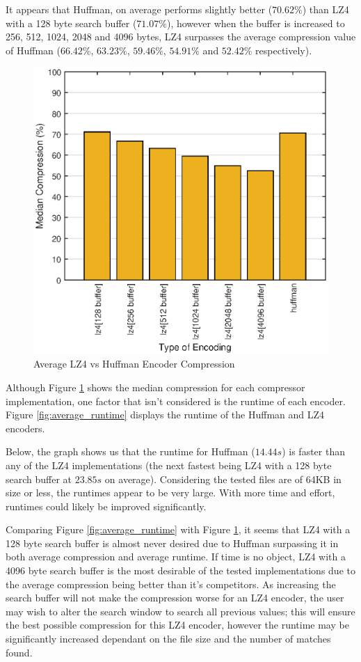 \documentclass[12pt]{article}
\begin{document}
It appears that Huffman, on average performs slightly better ($70.62\%$) than LZ4 with a 128 byte search buffer ($71.07\%$), however when the buffer is increased to 256, 512, 1024, 2048 and 4096 bytes, LZ4 surpasses the average compression value of Huffman ($66.42\%$, $63.23\%$, $59.46\%$, $54.91\%$ and $52.42\%$ respectively). 

\begin{figure}[H]
	\centering
	\includegraphics[width=6.0in]{average_compression}
	\caption{Average LZ4 vs Huffman Encoder Compression}
	\label{fig:average_compression}
\end{figure}

Although Figure \ref{fig:average_compression} shows the median compression for each compressor implementation, one factor that isn't considered is the runtime of each encoder. Figure \ref{fig:average_runtime} displays the runtime of the Huffman and LZ4 encoders.

Below, the graph shows us that the runtime for Huffman ($14.44s$) is faster than any of the LZ4 implementations (the next fastest being LZ4 with a 128 byte search buffer at $23.85s$ on average). Considering the tested files are of 64KB in size or less, the runtimes appear to be very large. With more time and effort, runtimes could likely be improved significantly.

Comparing Figure \ref{fig:average_runtime} with Figure \ref{fig:average_compression}, it seems that LZ4 with a 128 byte search buffer is almost never desired due to Huffman surpassing it in both average compression and average runtime. If time is no object, LZ4 with a 4096 byte search buffer is the most desirable of the tested implementations due to the average compression being better than it's competitors. As increasing the search buffer will not make the compression worse for an LZ4 encoder, the user may wish to alter the search window to search all previous values; this will ensure the best possible compression for this LZ4 encoder, however the runtime may be significantly increased dependant on the file size and the number of matches found.
\end{document}
